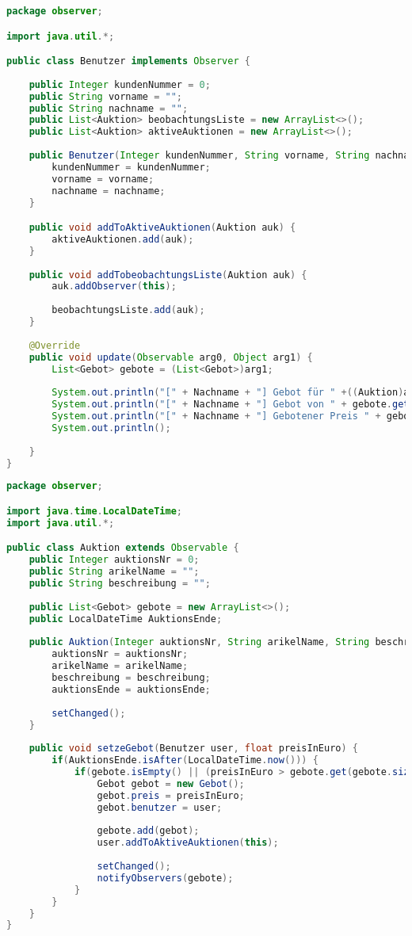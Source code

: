 \begin{lstlisting}[language=java, style=java, caption={Benutzer.java},
label={lst:lst5}]
package observer;

import java.util.*;

public class Benutzer implements Observer {
	
	public Integer kundenNummer = 0;
	public String vorname = "";
	public String nachname = "";
	public List<Auktion> beobachtungsListe = new ArrayList<>();
	public List<Auktion> aktiveAuktionen = new ArrayList<>();
	
	public Benutzer(Integer kundenNummer, String vorname, String nachname) {
		kundenNummer = kundenNummer;
		vorname = vorname;
		nachname = nachname;
	}

	public void addToAktiveAuktionen(Auktion auk) {
		aktiveAuktionen.add(auk);
	}
	
	public void addTobeobachtungsListe(Auktion auk) {
		auk.addObserver(this);
		
		beobachtungsListe.add(auk);
	}
	
	@Override
	public void update(Observable arg0, Object arg1) {
		List<Gebot> gebote = (List<Gebot>)arg1;
		
		System.out.println("[" + Nachname + "] Gebot für " +((Auktion)arg0).ArikelName);
		System.out.println("[" + Nachname + "] Gebot von " + gebote.get(gebote.size()-1).benutzer.Nachname);
		System.out.println("[" + Nachname + "] Gebotener Preis " + gebote.get(gebote.size()-1).preis);
		System.out.println();
		
	}	
}
\end{lstlisting}

\begin{lstlisting}[language=java, style=java, caption={Auktion.java},
label={lst:lst6}]
package observer;

import java.time.LocalDateTime;
import java.util.*;

public class Auktion extends Observable {
	public Integer auktionsNr = 0;
	public String arikelName = "";
	public String beschreibung = "";
	
	public List<Gebot> gebote = new ArrayList<>();
	public LocalDateTime AuktionsEnde;
	
	public Auktion(Integer auktionsNr, String arikelName, String beschreibung, LocalDateTime auktionsEnde) {
		auktionsNr = auktionsNr;
		arikelName = arikelName;
		beschreibung = beschreibung;
		auktionsEnde = auktionsEnde;
		
		setChanged();
	}
	
	public void setzeGebot(Benutzer user, float preisInEuro) {
		if(AuktionsEnde.isAfter(LocalDateTime.now())) {
			if(gebote.isEmpty() || (preisInEuro > gebote.get(gebote.size()-1).preis)) {
				Gebot gebot = new Gebot();
				gebot.preis = preisInEuro;
				gebot.benutzer = user;
				
				gebote.add(gebot);
				user.addToAktiveAuktionen(this);
				
				setChanged();
				notifyObservers(gebote);
			}
		}
	}
}
\end{lstlisting}
\clearpage 